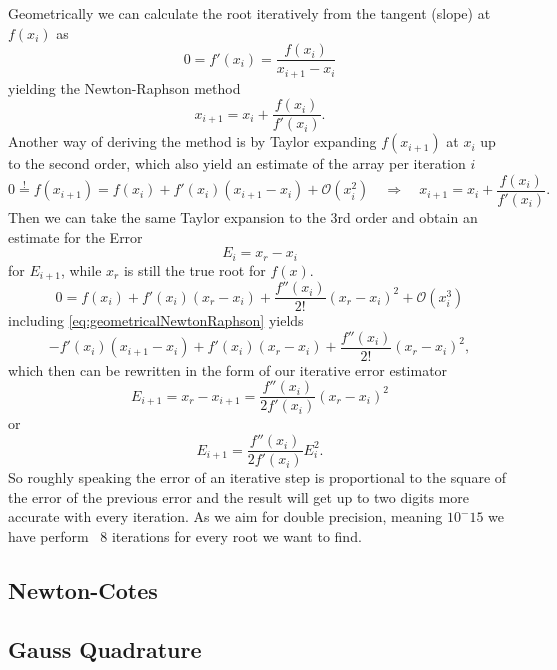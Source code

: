 Geometrically we can calculate the root iteratively from the tangent (slope) at $f(x_i)$ as
\begin{equation}
	\label{eq:geometricalNewtonRaphson}
	0 = f'(x_i) = \frac{f(x_i)}{x_{i+1}-x_i}
\end{equation}
yielding the Newton-Raphson method
\begin{equation}
	x_{i+1} = x_i + \frac{f(x_i)}{f'(x_i)}.
\end{equation}
Another way of deriving the method is by Taylor expanding $f(x_{i+1})$ at $x_i$ up to the second order, which also yield an estimate of the array per iteration $i$
\begin{equation}
	0 \overset{!}{=} f(x_{i+1}) = f(x_i) + f'(x_i) (x_{i+1} - x_i) + \mathcal{O}(x_i^2) \quad \Rightarrow \quad x_{i+1} = x_i + \frac{f(x_i)}{f'(x_i)}.
\end{equation}
Then we can take the same Taylor expansion to the 3rd order and obtain an estimate for the Error
\begin{equation}
	E_i = x_r - x_i
\end{equation}
for $E_{i+1}$, while $x_r$ is still the true root for $f(x)$.
\begin{equation}
	0 = f(x_i) + f'(x_i)(x_r-x_i) + \frac{f''(x_i)}{2!} (x_r - x_i)^2 + \mathcal{O}(x_i^3)
\end{equation}
including \eqref{eq:geometricalNewtonRaphson} yields 
\begin{equation}
	-f'(x_i)(x_{i+1} - x_i) + f'(x_i)(x_r - x_i) + \frac{f''(x_i)}{2!} (x_r - x_i)^2,
\end{equation}
which then can be rewritten in the form of our iterative error estimator
\begin{equation}
	E_{i+1} = x_r - x_{i+1} = \frac{f''(x_i)}{2 f'(x_i)} (x_r - x_i)^2
\end{equation}
or
\begin{equation}
	E_{i+1} = \frac{f''(x_i)}{2 f'(x_i)} E_i^2.
\end{equation}
So roughly speaking the error of an iterative step is proportional to the square of the error of the previous error and the result will get up to two digits more accurate with every iteration. As we aim for double precision, meaning $10^-15$ we have perform ~8 iterations for every root we want to find.


\subsection{Newton-Cotes}
\subsection{Gauss Quadrature}
